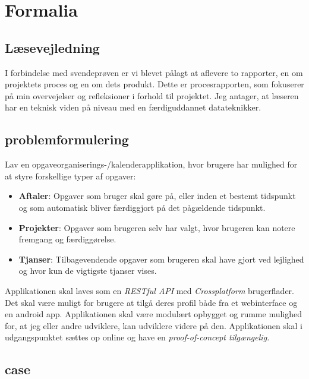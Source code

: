 \documentclass{report}
\begin{document}
\maketitle
\makeTechTitlecard
\tableofcontents

\chapter{Formalia}

\section{Læsevejledning}
I forbindelse med svendeprøven er vi blevet pålagt at aflevere to rapporter, en om projektets proces og en om dets produkt. Dette er procesrapporten, som  fokuserer på min overvejelser og refleksioner i forhold til projektet.
Jeg antager, at læseren har en teknisk viden på niveau med en færdiguddannet datateknikker.


\section{problemformulering}
Lav en opgaveorganiserings-/kalenderapplikation, hvor brugere har mulighed for at styre forskellige typer af opgaver:
\begin{itemize}
\item \textbf{Aftaler}: Opgaver som bruger skal gøre på, eller inden et bestemt tidspunkt og som automatisk bliver færdiggjort på det pågældende tidspunkt.
\item \textbf{Projekter}: Opgaver som brugeren selv har valgt, hvor brugeren kan notere fremgang og færdiggørelse.
\item \textbf{Tjanser}: Tilbagevendende opgaver som brugeren skal have gjort ved lejlighed og hvor kun de vigtigste tjanser vises. 
\end{itemize}	
Applikationen skal laves som en \textit{RESTful API} med \textit{Crossplatform} brugerflader. Det skal være muligt for brugere at tilgå deres profil både fra et webinterface og en android app.
Applikationen skal være modulært opbygget og rumme mulighed for, at jeg eller andre udviklere, kan udviklere videre på den.
Applikationen skal i udgangspunktet sættes op online og have en \textit{proof-of-concept tilgængelig.}

\section{case}
\end{document}
